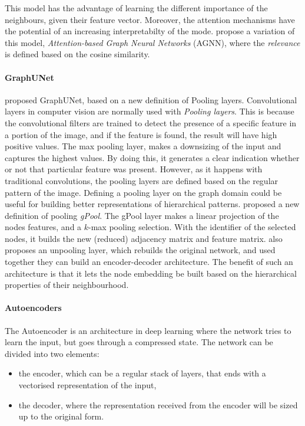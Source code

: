 \documentclass[smallextended]{svjour3}
\begin{document}
\begin{appendices}
		This model has the advantage of learning the different importance of the neighbours, given their feature vector. Moreover, the attention mechanisms have the potential of an increasing interpretabilty of the mode. \cite{thekumparampil_attention-based_2018} propose a variation of this model, \textit{Attention-based Graph Neural Networks} (AGNN), where the \textit{relevance} is defined based on the cosine similarity.
		
		\paragraph{GraphUNet} \cite{gao_graph_2019} proposed GraphUNet, based on a new definition of Pooling layers. Convolutional layers in computer vision are normally used with \textit{Pooling layers}. This is because the convolutional filters are trained to detect the presence of a specific feature in a portion of the image, and if the feature is found, the result will have high positive values. The max pooling layer, makes a downsizing of the input and captures the highest values. By doing this, it generates a clear indication whether or not that particular feature was present.
		However, as it happens with traditional convolutions, the pooling layers are defined based on the regular pattern of the image. Defining a pooling layer on the graph domain could be useful for building better representations of hierarchical patterns.
		\cite{gao_graph_2019} proposed a new definition of pooling \textit{gPool}. The gPool layer makes a linear projection of the nodes features, and a $k$-max pooling selection. With the identifier of the selected nodes, it builds the new (reduced) adjacency matrix and feature matrix. \cite{gao_graph_2019} also proposes an unpooling layer, which rebuilds the original network, and used together they can build an encoder-decoder architecture. The benefit of such an architecture is that it lets the node embedding be built based on the hierarchical properties of their neighbourhood. 
		
		\paragraph{Autoencoders}
		
		The Autoencoder is an architecture in deep learning where the network tries to learn the input, but goes through a compressed state. The network can be divided into two elements:
		
		\begin{itemize}
			\item the encoder, which can be a regular stack of layers, that ends with a vectorised representation of the input,
			\item the decoder, where the representation received from the encoder will be sized up to the original form. 
		\end{itemize}
		

\end{appendices}
\end{document}

